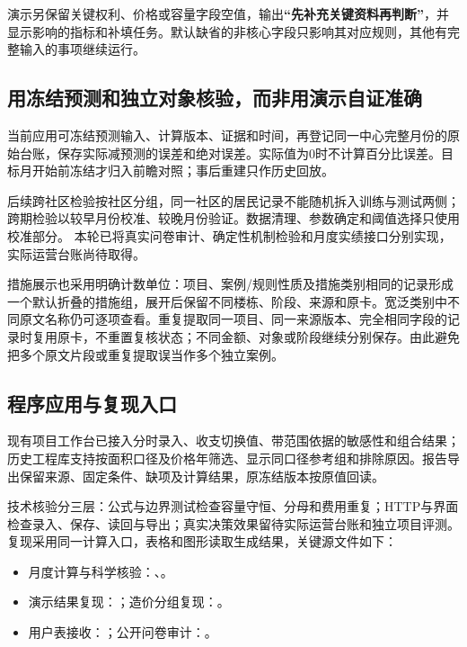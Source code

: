 演示另保留关键权利、价格或容量字段空值，输出\textbf{“先补充关键资料再判断”}，并显示影响的指标和补填任务。默认缺省的非核心字段只影响其对应规则，其他有完整输入的事项继续运行。

\subsection{用冻结预测和独立对象核验，而非用演示自证准确}

当前应用可冻结预测输入、计算版本、证据和时间，再登记同一中心完整月份的原始台账，保存实际减预测的误差和绝对误差。实际值为0时不计算百分比误差。目标月开始前冻结才归入前瞻对照；事后重建只作历史回放。

后续跨社区检验按社区分组，同一社区的居民记录不能随机拆入训练与测试两侧；跨期检验以较早月份校准、较晚月份验证。数据清理、参数确定和阈值选择只使用校准部分。\cite{groupcv} 本轮已将真实问卷审计、确定性机制检验和月度实绩接口分别实现，实际运营台账尚待取得。

措施展示也采用明确计数单位：项目、案例/规则性质及措施类别相同的记录形成一个默认折叠的措施组，展开后保留不同楼栋、阶段、来源和原卡。宽泛类别中不同原文名称仍可逐项查看。重复提取同一项目、同一来源版本、完全相同字段的记录时复用原卡，不重置复核状态；不同金额、对象或阶段继续分别保存。由此避免把多个原文片段或重复提取误当作多个独立案例。

\subsection{程序应用与复现入口}

现有项目工作台已接入分时录入、收支切换值、带范围依据的敏感性和组合结果；历史工程库支持按面积口径及价格年筛选、显示同口径参考组和排除原因。报告导出保留来源、固定条件、缺项及计算结果，原冻结版本按原值回读。

技术核验分三层：公式与边界测试检查容量守恒、分母和费用重复；HTTP与界面检查录入、保存、读回与导出；真实决策效果留待实际运营台账和独立项目评测。复现采用同一计算入口，表格和图形读取生成结果，关键源文件如下：
\begin{itemize}
\item 月度计算与科学核验：、。
\item 演示结果复现：；造价分组复现：。
\item 用户表接收：；公开问卷审计：。
\end{itemize}
